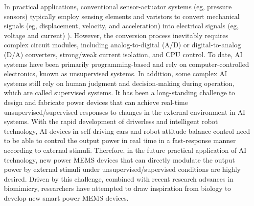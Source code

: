 In practical applications, conventional sensor-actuator systems (eg, pressure sensors) typically employ sensing elements and varistors to convert mechanical signals (eg, displacement, velocity, and acceleration) into electrical signals (eg, voltage and current) ). However, the conversion process inevitably requires complex circuit modules, including analog-to-digital (A/D) or digital-to-analog (D/A) converters, strong/weak current isolation, and CPU control. To date, AI systems have been primarily programming-based and rely on computer-controlled electronics, known as unsupervised systems. In addition, some complex AI systems still rely on human judgment and decision-making during operation, which are called supervised systems. It has been a long-standing challenge to design and fabricate power devices that can achieve real-time unsupervised/supervised responses to changes in the external environment in AI systems. With the rapid development of driverless and intelligent robot technology, AI devices in self-driving cars and robot attitude balance control need to be able to control the output power in real time in a fast-response manner according to external stimuli. Therefore, in the future practical application of AI technology, new power MEMS devices that can directly modulate the output power by external stimuli under unsupervised/supervised conditions are highly desired. Driven by this challenge, combined with recent research advances in biomimicry, researchers have attempted to draw inspiration from biology to develop new smart power MEMS devices.

